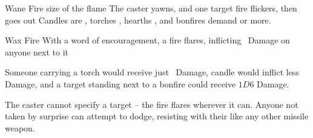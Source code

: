   {}%
  {Wane}%
  {Fire}%
  {size of the flame}%
  {The caster yawns, and one target fire flickers, then goes out}%
  {Candles are \tn[6], torches \tn[7], hearths \tn[8], and bonfires demand \tn[9] or more.}

  {}%
  {Wax}%
  {Fire}%
  {}%
  {With a word of encouragement, a fire flares, inflicting \showDam\ Damage on anyone next to it}%
  {

    Someone carrying a torch would receive just \showDam\ Damage, candle would inflict less Damage, and a target standing next to a bonfire could receive $1D6$ Damage.

    The caster cannot specify a target -- the fire flares wherever it can.
    Anyone not taken by surprise can attempt to dodge, resisting with their  like any other missile weapon.}

